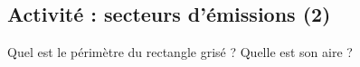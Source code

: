 
\subsection*{Activité : secteurs d'émissions (2)}

Quel est le périmètre du rectangle grisé ? Quelle est son aire ?
\begin{center}
   
\end{center}
